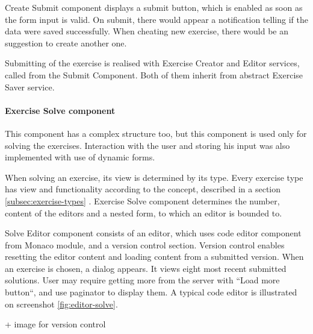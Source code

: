                 Create Submit component displays a submit button, which is enabled as soon as the form input is valid. On submit, there would appear a notification telling if the data were saved successfully. When cheating new exercise, there would be an suggestion to create another one.
                
                Submitting of the exercise is realised with Exercise Creator and Editor services, called from the Submit Component. Both of them inherit from abstract Exercise Saver service.
    
                \paragraph{Exercise Solve component}
                This component has a complex structure too, but this component is used only for solving the exercises. Interaction with the user and storing his input was also implemented with use of dynamic forms.
                
                When solving an exercise, its view is determined by its type. Every exercise type has view and functionality according to the concept, described in a section \ref{subsec:exercise-types} . Exercise Solve component determines the number, content of the editors and a nested form, to which an editor is bounded to.
                
                Solve Editor component consists of an editor, which uses code editor component from Monaco module, and a version control section. Version control enables resetting the editor content and loading content from a submitted version. When an exercise is chosen, a dialog appears. It views eight most recent submitted solutions. User may require getting more from the server with ``Load more button``, and use paginator to display them. A typical code editor is illustrated on screenshot \ref{fig:editor-solve}.
                
                + image for version control
                
